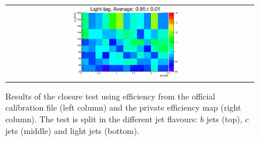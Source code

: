 \begin{figure}
\begin{center}
\begin{tabular}{c c}
    \includegraphics[width=0.45\textwidth]{objectsreconstruction/figures/TRFmethod/0myclosureRebin.eps} \\
  \end{tabular}
  \end{center}
  \caption{Results of the closure test using efficiency from the official calibration file 
  (left column) and the private efficiency map (right column). The test is split in the
 different jet flavours: $b$ jets (top), $c$ jets (middle) and light jets (bottom). }
  \label{fig:closure}
\end{figure}


